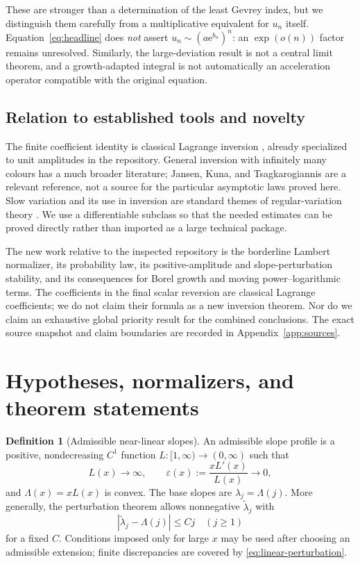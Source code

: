 \documentclass[11pt,a4paper]{article}
\numberwithin{equation}{section}
\theoremstyle{definition}
\newtheorem{definition}[theorem]{Definition}
\theoremstyle{remark}
\newcommand{\eps}{\varepsilon}
\newcommand{\ee}{\mathrm e}
\begin{document}
These are stronger than a determination of the least Gevrey index, but
we distinguish them carefully from a multiplicative equivalent for
$u_n$ itself. Equation~\eqref{eq:headline} does \emph{not} assert
$u_n\sim(a\ee^{b_n})^n$: an $\exp(o(n))$ factor remains unresolved.
Similarly, the large-deviation result is not a central limit theorem,
and a growth-adapted integral is not automatically an acceleration
operator compatible with the original equation.

\subsection{Relation to established tools and novelty}
The finite coefficient identity is classical Lagrange inversion
\cite{gessel}, already specialized to unit amplitudes in the repository.
General inversion with infinitely many colours has a much broader
literature; Jansen, Kuna, and Tsagkarogiannis \cite{jkt} are a relevant
reference, not a source for the particular asymptotic laws proved here.
Slow variation and its use in inversion are standard themes of
regular-variation theory \cite{bgt}. We use a differentiable subclass so
that the needed estimates can be proved directly rather than imported
as a large technical package.

The new work relative to the inspected repository is the borderline
Lambert normalizer, its probability law, its positive-amplitude and
slope-perturbation stability, and its consequences for Borel growth and
moving power--logarithmic terms. The coefficients in the final scalar
reversion are classical Lagrange coefficients; we do not claim their
formula as a new inversion theorem. Nor do we claim an exhaustive global
priority result for the combined conclusions. The exact source snapshot
and claim boundaries are recorded in Appendix~\ref{app:sources}.

\section{Hypotheses, normalizers, and theorem statements}
\label{sec:statements}

\begin{definition}[Admissible near-linear slopes]
\label{def:admissible}
An admissible slope profile is a positive, nondecreasing $C^1$ function
$L:[1,\infty)\to(0,\infty)$ such that
\begin{equation}
 L(x)\longrightarrow\infty,\qquad
 \eps(x):=\frac{xL'(x)}{L(x)}\longrightarrow0,
 \label{eq:elasticity}
\end{equation}
and $\Lambda(x)=xL(x)$ is convex. The base slopes are
$\lambda_j=\Lambda(j)$. More generally, the perturbation theorem allows
nonnegative $\widetilde\lambda_j$ with
\begin{equation}
 |\widetilde\lambda_j-\Lambda(j)|\le Cj
 \quad(j\ge1)
 \label{eq:linear-perturbation}
\end{equation}
for a fixed $C$. Conditions imposed only for large $x$ may be used after
choosing an admissible extension; finite discrepancies are covered by
\eqref{eq:linear-perturbation}.
\end{definition}
\end{document}
